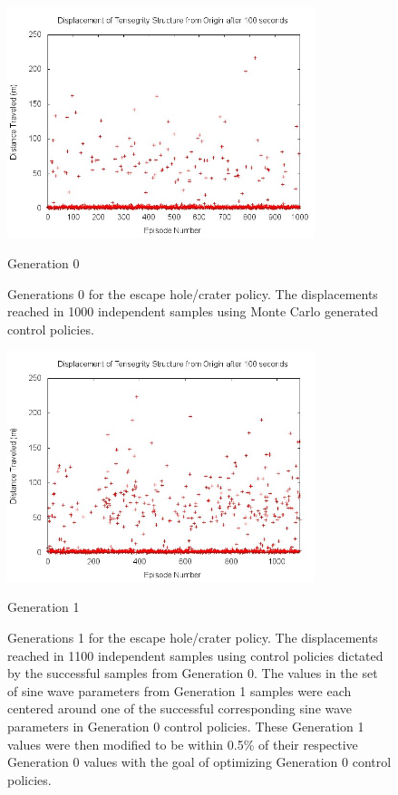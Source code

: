 \begin{figure}[thpb]
\centering
\includegraphics[width=0.8\textwidth]{tex/ARMS_2015/Pictures/gen0distances.jpg}
\caption{Generation 0}
\label{gen0scatter}
\caption{Generations 0 for the escape hole/crater policy. The displacements reached in 1000 independent samples using Monte Carlo generated control policies.}
\end{figure}

\begin{figure}[thpb]
\centering
\includegraphics[width=0.8\textwidth]{tex/ARMS_2015/Pictures/gen1distances.jpg}
\caption{Generation 1}
\label{gen1scatter}
\caption{Generations 1 for the escape hole/crater policy. The displacements reached in 1100 independent samples using control policies dictated by the successful samples from Generation 0. The values in the set of sine wave parameters from Generation 1 samples were each centered around one of the successful corresponding sine wave parameters in Generation 0 control policies. These Generation 1 values were then modified to be within 0.5\% of their respective Generation 0 values with the goal of optimizing Generation 0 control policies.}
\end{figure}


